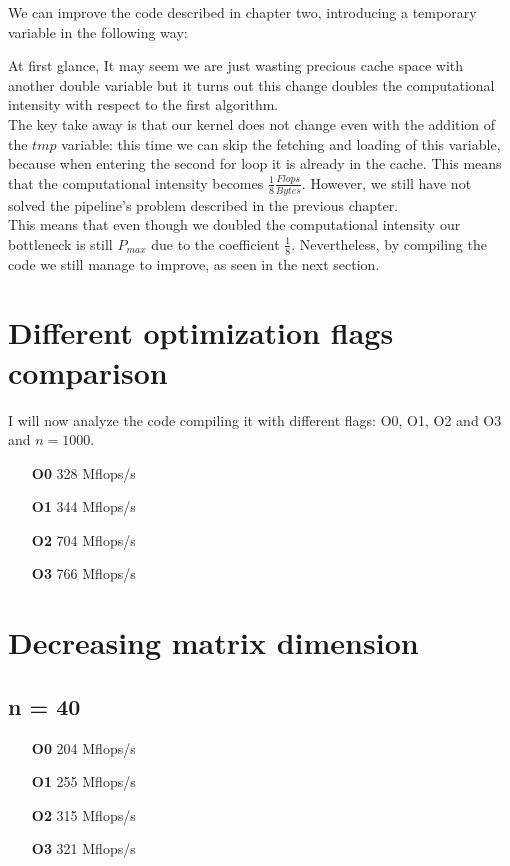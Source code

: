 \documentclass[11pt,a4paper,oneside,titlepage,openright]{book}
\begin{document}
We can improve the code described in chapter two, introducing a temporary variable in the following way: 


At first glance, It may seem we are just wasting precious cache space with another double variable but it turns out this change doubles the computational intensity with respect to the first algorithm. \\
The key take away is that our kernel does not change even with the addition of the $\textit{tmp}$ variable: this time we can skip the fetching and loading of this variable, because when entering the second for loop it is already in the cache. This means that the computational intensity becomes $\frac{1}{8}\frac{Flops}{Bytes}$. 
However, we still have not solved the pipeline's problem described in the previous chapter. \\
This means that even though we doubled the computational intensity our bottleneck is still $P_{max}$ due to the coefficient $\frac{1}{8}$.  
Nevertheless, by compiling the code we still manage to improve, as seen in the next section. 

\section{Different optimization flags comparison}
I will now analyze the code compiling it with different flags: O0, O1, O2 and O3 and $n = 1000$.

\begin{itemize}
\item[\textbf{O0}] 328  Mflops/s
\item[\textbf{O1}] 344 Mflops/s
\item[\textbf{O2}] 704 Mflops/s
\item[\textbf{O3}] 766 Mflops/s
\end{itemize}

\section{Decreasing matrix dimension} 

\subsection{ n = 40}
\begin{itemize}
\item[\textbf{O0}] 204  Mflops/s
\item[\textbf{O1}] 255 Mflops/s
\item[\textbf{O2}] 315 Mflops/s
\item[\textbf{O3}] 321 Mflops/s
\end{itemize}
\end{document}
